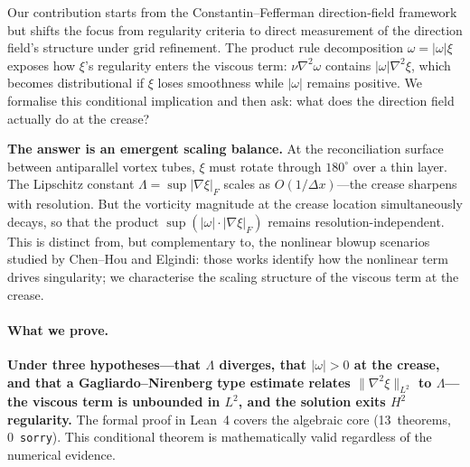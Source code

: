 \documentclass[11pt,a4paper]{article}
\theoremstyle{definition}
\newcommand{\grad}{\nabla}
\newcommand{\lapl}{\nabla^2}
\newcommand{\norm}[1]{\lVert #1 \rVert}
\newcommand{\abs}[1]{\lvert #1 \rvert}
\newcommand{\strongclaim}[1]{\textbf{#1}}  %
\begin{document}
Our contribution starts from the Constantin--Fefferman direction-field
framework but shifts the focus from regularity criteria to direct
measurement of the direction field's structure under grid refinement.
The product rule decomposition $\omega=\abs{\omega}\xi$ exposes how
$\xi$'s regularity enters the viscous term: $\nu\lapl\omega$ contains
$\abs{\omega}\lapl\xi$, which becomes distributional if $\xi$ loses
smoothness while $\abs{\omega}$ remains positive.  We formalise this
conditional implication and then ask: what does the direction field
actually do at the crease?

\strongclaim{The answer is an emergent scaling balance.}  At the
reconciliation surface between antiparallel vortex tubes, $\xi$ must
rotate through $180^\circ$ over a thin layer.  The Lipschitz constant
$\Lambda=\sup\abs{\grad\xi}_F$ scales as $O(1/\Delta x)$---the
crease sharpens with resolution.  But the vorticity magnitude at the
crease location simultaneously decays, so that the product
$\sup(\abs{\omega}\cdot\abs{\grad\xi}_F)$ remains
resolution-independent.  This is distinct from, but complementary to,
the nonlinear blowup scenarios studied by Chen--Hou and Elgindi:
those works identify how the nonlinear term drives singularity; we
characterise the scaling structure of the viscous term at the crease.

\paragraph{What we prove.}
\strongclaim{Under three hypotheses---that $\Lambda$ diverges, that
$\abs{\omega}>0$ at the crease, and that a Gagliardo--Nirenberg
type estimate relates $\norm{\lapl\xi}_{L^2}$ to $\Lambda$---the
viscous term is unbounded in $L^2$, and the solution exits $H^2$
regularity.}  The formal proof in Lean~4 covers the algebraic core
(13~theorems, 0~\texttt{sorry}).  This conditional theorem is
mathematically valid regardless of the numerical evidence.
\end{document}
